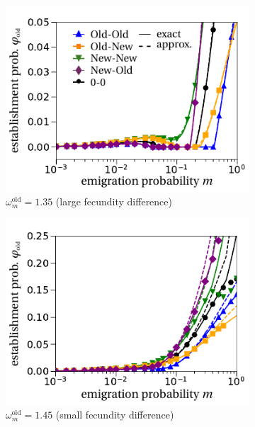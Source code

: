 \documentclass[11pt]{article}
\begin{document}
\begin{figure}[t!]
	\centering
	\begin{subfigure}{.5\textwidth}
		\centering
		\includegraphics[width=\linewidth]{fig2a.pdf}
		\caption{$\omega^\text{old}_m=1.35$ (large fecundity difference)}
	\end{subfigure}%
	\begin{subfigure}{.5\textwidth}
		\centering
		\includegraphics[width=\linewidth]{fig2c.pdf}
		\caption{$\omega^\text{old}_m=1.45$ (small fecundity difference)}
	\end{subfigure}
	\begin{subfigure}{.5\textwidth}
		\centering

\end{subfigure}
\end{figure}
\end{document}
